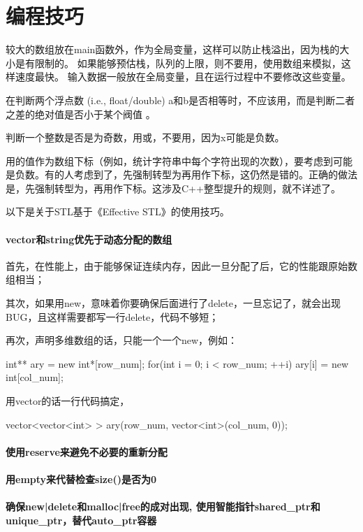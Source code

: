 \chapter{编程技巧}
较大的数组放在main函数外，作为全局变量，这样可以防止栈溢出，因为栈的大小是有限制的。
如果能够预估栈，队列的上限，则不要用，使用数组来模拟，这样速度最快。
输入数据一般放在全局变量，且在运行过程中不要修改这些变量。


在判断两个浮点数 (i.e., 
float/double) 
a和b是否相等时，不应该用，而是判断二者之差的绝对值是否小于某个阀值 
。

判断一个整数是否是为奇数，用或，不要用，因为x可能是负数。

用的值作为数组下标（例如，统计字符串中每个字符出现的次数），要考虑到可能是负数。有的人考虑到了，先强制转型为再用作下标，这仍然是错的。正确的做法是，先强制转型为，再用作下标。这涉及C++整型提升的规则，就不详述了。

以下是关于STL基于《Effective STL》的使用技巧。

\subsubsection{vector和string优先于动态分配的数组}
首先，在性能上，由于能够保证连续内存，因此一旦分配了后，它的性能跟原始数组相当；

其次，如果用new，意味着你要确保后面进行了delete，一旦忘记了，就会出现BUG，且这样需要都写一行delete，代码不够短；

再次，声明多维数组的话，只能一个一个new，例如：
\begin{Code}
	int** ary = new int*[row_num];
	for(int i = 0; i < row_num; ++i)
		ary[i] = new int[col_num];
\end{Code}

用vector的话一行代码搞定，
\begin{Code}
	vector<vector<int> > ary(row_num, vector<int>(col_num, 0));
\end{Code}
\subsubsection{使用reserve来避免不必要的重新分配}
\subsubsection{用empty来代替检查size()是否为0}
\subsubsection{确保new|delete和malloc|free的成对出现, 
使用智能指针shared_ptr和unique_ptr，替代auto_ptr容器}
